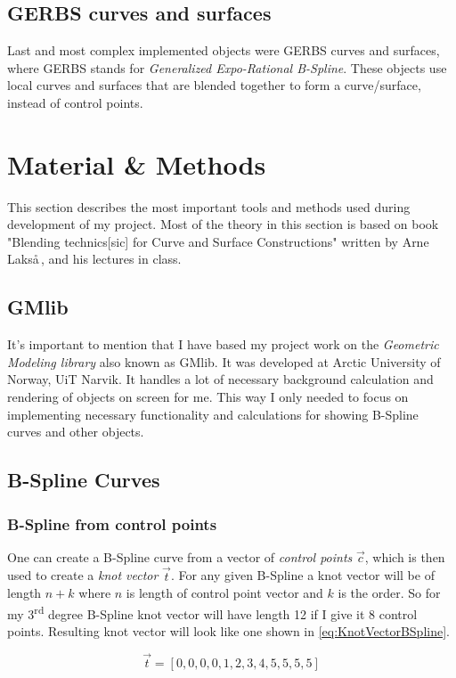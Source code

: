\documentclass[a4paper,12pt]{extarticle}
\begin{document}
\subsection{GERBS curves and surfaces}
Last and most complex implemented objects were GERBS curves and surfaces, where GERBS stands for \emph{Generalized Expo-Rational B-Spline}. These objects use local curves and surfaces that are blended together to form a curve/surface, instead of control points.

\section{Material \& Methods}
This section describes the most important tools and methods used during development of my project. Most of the theory in this section is based on book "Blending technics[sic] for Curve and Surface Constructions" written by Arne Laks\aa \,\citep{Laksa2012}, and his lectures in class.

\subsection{GMlib}
It's important to mention that I have based my project work on the \emph{Geometric Modeling library} also known as GMlib. It was developed at Arctic University of Norway, UiT Narvik. It handles a lot of necessary background calculation and rendering of objects on screen for me. This way I only needed to focus on implementing necessary functionality and calculations for showing B-Spline curves and other objects.

\subsection{B-Spline Curves}
\subsubsection{B-Spline from control points}
One can create a B-Spline curve from a vector of \emph{control points} $\vec{c}$, which is then used to create a \emph{knot vector} $\vec{t}$. For any given B-Spline a knot vector will be of length $n+k$ where $n$ is length of control point vector and $k$ is the order. So for my 3\textsuperscript{rd} degree B-Spline knot vector will have length 12 if I give it 8 control points. Resulting knot vector will look like one shown in \cref{eq:KnotVectorBSpline}.

\begin{equation}
\vec{t}= [0,0,0,0,1,2,3,4,5,5,5,5]
\label{eq:KnotVectorBSpline}
\end{equation}
\end{document}
